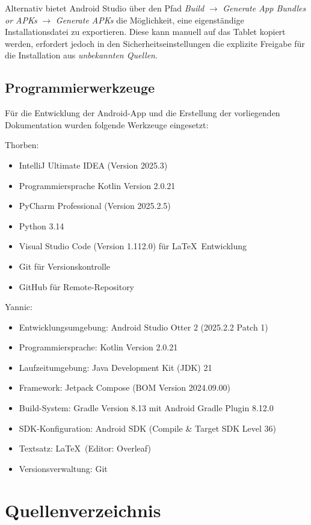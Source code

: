 \documentclass{article}
\begin{document}
Alternativ bietet Android Studio über den Pfad \textit{Build} $\rightarrow$ \textit{Generate App Bundles or APKs} $\rightarrow$ \textit{Generate APKs} die Möglichkeit, eine eigenständige Installationsdatei zu exportieren. Diese kann manuell auf das Tablet kopiert werden, erfordert jedoch in den Sicherheitseinstellungen die explizite Freigabe für die Installation aus \textit{unbekannten Quellen}.

\subsection{Programmierwerkzeuge}
Für die Entwicklung der Android-App und die Erstellung der vorliegenden Dokumentation wurden folgende Werkzeuge eingesetzt:

Thorben:
\begin{itemize}
    \item IntelliJ Ultimate IDEA (Version 2025.3)
    \item Programmiersprache Kotlin Version 2.0.21
    \item PyCharm Professional (Version 2025.2.5)
    \item Python 3.14
    \item Visual Studio Code (Version 1.112.0) für \LaTeX\ Entwicklung
    \item Git für Versionskontrolle
    \item GitHub für Remote-Repository
\end{itemize}

Yannic:
\begin{itemize}
    \item Entwicklungsumgebung: Android Studio Otter 2 (2025.2.2 Patch 1)
    \item Programmiersprache: Kotlin Version 2.0.21
    \item Laufzeitumgebung: Java Development Kit (JDK) 21
    \item Framework: Jetpack Compose (BOM Version 2024.09.00)
    \item Build-System: Gradle Version 8.13 mit Android Gradle Plugin 8.12.0
    \item SDK-Konfiguration: Android SDK (Compile \& Target SDK Level 36)
    \item Textsatz: \LaTeX\ (Editor: Overleaf)
    \item Versionsverwaltung: Git
\end{itemize}

\section{Quellenverzeichnis}
\end{document}
